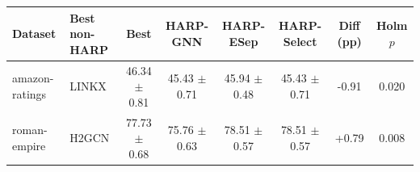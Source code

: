 \begin{tabular*}{0.94\linewidth}{@{\extracolsep{\fill}}llcccccc@{}}
\toprule
Dataset & Best non-HARP & Best & HARP-GNN & HARP-ESep & HARP-Select & Diff (pp) & Holm $p$ \\
\midrule
amazon-ratings & LINKX & 46.34 $\pm$ 0.81 & 45.43 $\pm$ 0.71 & 45.94 $\pm$ 0.48 & 45.43 $\pm$ 0.71 & -0.91 & 0.020 \\
roman-empire & H2GCN & 77.73 $\pm$ 0.68 & 75.76 $\pm$ 0.63 & 78.51 $\pm$ 0.57 & 78.51 $\pm$ 0.57 & +0.79 & 0.008 \\
\bottomrule
\end{tabular*}
